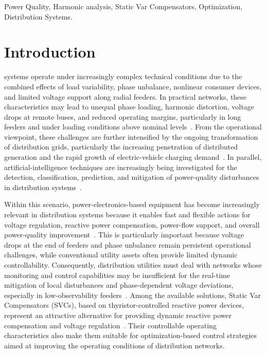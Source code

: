 \documentclass[journal]{IEEEtran}
\begin{document}
\begin{IEEEkeywords}
 Power Quality, Harmonic analysis, Static Var Compensators, Optimization, Distribution Systems.
\end{IEEEkeywords}


\section{Introduction}
  systems operate under increasingly complex technical conditions due to the combined effects of load variability, phase unbalance, nonlinear consumer devices, and limited voltage support along radial feeders. In practical networks, these characteristics may lead to unequal phase loading, harmonic distortion, voltage drops at remote buses, and reduced operating margins, particularly in long feeders and under loading conditions above nominal levels~\cite{loji2023operational}. From the operational viewpoint, these challenges are further intensified by the ongoing transformation of distribution grids, particularly the increasing penetration of distributed generation and the rapid growth of electric-vehicle charging demand~\cite{nasir2024hosting,ghaffari2025planning}. In parallel, artificial-intelligence techniques are increasingly being investigated for the detection, classification, prediction, and mitigation of power-quality disturbances in distribution systems~\cite{dehaghani2025ai}.

Within this scenario, power-electronics-based equipment has become increasingly relevant in distribution systems because it enables fast and flexible actions for voltage regulation, reactive power compensation, power-flow support, and overall power-quality improvement~\cite{Stanelyte2020VoltVar}. This is particularly important because voltage drops at the end of feeders and phase unbalance remain persistent operational challenges, while conventional utility assets often provide limited dynamic controllability. Consequently, distribution utilities must deal with networks whose monitoring and control capabilities may be insufficient for the real-time mitigation of local disturbances and phase-dependent voltage deviations, especially in low-observability feeders~\cite{Yadav2023DSSE}. Among the available solutions, Static Var Compensators (SVCs), based on thyristor-controlled reactive power devices, represent an attractive alternative for providing dynamic reactive power compensation and voltage regulation~\cite{Stanelyte2020VoltVar,Liu2020SVCUnbalance}. Their controllable operating characteristics also make them suitable for optimization-based control strategies aimed at improving the operating conditions of distribution networks.
\end{document}
